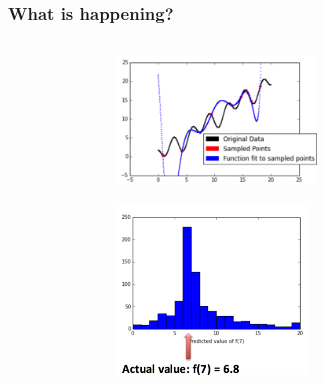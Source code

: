 \documentclass[xcolor={dvipsnames}]{beamer}
\begin{document}
\frame
{
\frametitle{What is happening?}

\begin{columns}
\begin{column}{.05\textwidth}
${}$
\end{column}
\begin{column}{.5\textwidth}
\includegraphics[width=2.1in]{stuffs/rfex3.png}

\includegraphics[width=2in]{stuffs/rfex2.png}
\end{column}
\begin{column}{.4\textwidth}
\end{column}
\end{columns}

}
\end{document}
